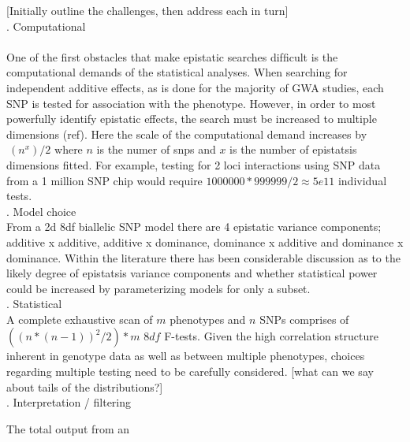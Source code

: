 \documentclass{article}
\begin{document}
[Initially outline the challenges, then address each in turn] \\
. Computational \\ 
 \\
\newline
One of the first obstacles that make epistatic searches difﬁcult is the computational demands of the statistical analyses. When searching for independent additive effects, as is done for the majority of GWA studies, each SNP is tested for association with the phenotype. However, in order to most powerfully identify epistatic effects, the search must be increased to multiple dimensions (ref). Here the scale of the computational demand increases by $~(n^x)/2$ where $n$ is the numer of snps and $x$ is the number of epistatsis dimensions fitted. For example, testing for 2 loci interactions using SNP data from a 1 million SNP chip would require $1000000 * 999999/2 \approx 5e11$ individual tests. \\     
. Model choice \\
\newline
From a 2d 8df biallelic SNP model there are 4 epistatic variance components; additive x additive, additive x
dominance, dominance x additive and dominance x dominance. Within the literature there has been considerable discussion as to the likely degree of epistatsis variance components and whether statistical power could be increased by parameterizing models for only a subset. \\  
. Statistical \\
A complete exhaustive scan of $m$ phenotypes and $n$ SNPs comprises of $((n*(n-1))^2/2)*m$ $8df$ F-tests. Given the high correlation structure inherent in genotype data as well as between multiple phenotypes, choices regarding multiple testing need to be carefully considered. [what can we say about tails of the distributions?]  \\
. Interpretation / filtering 

The total output from an 
\end{document}
